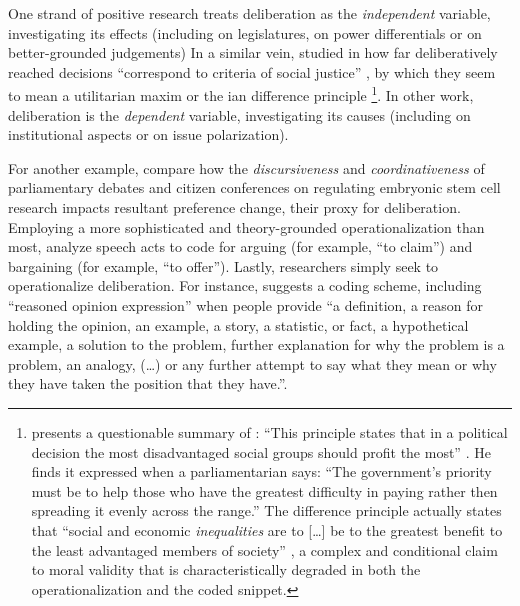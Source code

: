 One strand of positive research treats deliberation as the \emph{independent} variable, investigating its effects (including \citealt{Bachtiger2005} on legislatures, \citealt{Hibbings2002} on power differentials or \citealt{Jackman2008} on better-grounded judgements) %
In a similar vein, \cite{Steiner2004} studied in how far deliberatively reached decisions ``correspond to criteria of social justice'' \cite[13]{Steiner2012}, by which they seem to mean a utilitarian maxim \citep{Bentham1789} or the \citeauthor{Rawls-1971}ian difference principle \cite[95]{Steiner2012}
\footnote{
	\citeauthor{Steiner2012} presents a questionable summary of \citeauthor{Rawls-1971}: 
	``This principle states that in a political decision the most disadvantaged social groups should profit the most'' \citep[95]{Steiner2012}.
	He finds it expressed when a parliamentarian says: 
	``The government's priority must be to help those who have the greatest difficulty in paying rather then spreading it evenly across the range.''
	The difference principle actually states that ``social and economic \emph{inequalities} are to [\ldots] be to the greatest benefit to the least advantaged members of society'' \cite[266]{Rawls-1971}, a complex and conditional claim to moral validity that is characteristically degraded in both the operationalization and the coded snippet.
}.
In other work, deliberation is the \emph{dependent} variable, investigating its causes (including \citealt{Steiner2004} on institutional aspects or \citealt[13]{Steiner2012} on issue polarization).

For another example, \cite{Landwehr2010} compare how the \emph{discursiveness} and \emph{coordinativeness} of parliamentary debates and citizen conferences on regulating embryonic stem cell research impacts resultant preference change, their proxy for deliberation.
Employing a more sophisticated and theory-grounded operationalization than most, \cite[377]{Landwehr2010} analyze speech acts to code for arguing (for example, ``to claim'') and bargaining (for example, ``to offer''). %
Lastly, researchers simply seek to operationalize deliberation. 
For instance, \cite{Stromer-Galley2007} suggests a coding scheme, including ``reasoned opinion expression'' when people provide ``a definition, a reason for holding the opinion, an example, a story, a statistic, or fact, a hypothetical example, a solution to the problem, further explanation for why the problem is a problem, an analogy, (\ldots) or any further attempt to say what they mean or why they have taken the position that they have.''.

